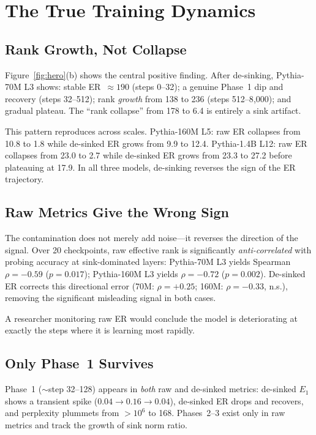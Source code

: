 \documentclass[11pt]{article}
\begin{document}
\section{The True Training Dynamics}\label{sec:true}

\subsection{Rank Growth, Not Collapse}\label{sec:growth}

Figure~\ref{fig:hero}(b) shows the central positive finding.
After de-sinking, Pythia-70M L3 shows: stable ER~$\approx 190$ (steps 0--32); a genuine Phase~1 dip and recovery (steps 32--512); rank \emph{growth} from 138 to 236 (steps 512--8{,}000); and gradual plateau.
The ``rank collapse'' from 178 to 6.4 is entirely a sink artifact.

This pattern reproduces across scales.
Pythia-160M L5: raw ER collapses from 10.8 to 1.8 while de-sinked ER grows from 9.9 to 12.4.
Pythia-1.4B L12: raw ER collapses from 23.0 to 2.7 while de-sinked ER grows from 23.3 to 27.2 before plateauing at 17.9.
In all three models, de-sinking reverses the sign of the ER trajectory.

\subsection{Raw Metrics Give the Wrong Sign}\label{sec:misleading}

The contamination does not merely add noise---it reverses the direction of the signal.
Over 20 checkpoints, raw effective rank is significantly \emph{anti-correlated} with probing accuracy at sink-dominated layers: Pythia-70M L3 yields Spearman $\rho = -0.59$ ($p = 0.017$); Pythia-160M L3 yields $\rho = -0.72$ ($p = 0.002$).
De-sinked ER corrects this directional error (70M: $\rho = +0.25$; 160M: $\rho = -0.33$, n.s.), removing the significant misleading signal in both cases.

A researcher monitoring raw ER would conclude the model is deteriorating at exactly the steps where it is learning most rapidly.

\subsection{Only Phase~1 Survives}\label{sec:phase1}

Phase~1 (${\sim}$step 32--128) appears in \emph{both} raw and de-sinked metrics: de-sinked $E_1$ shows a transient spike ($0.04 \to 0.16 \to 0.04$), de-sinked ER drops and recovers, and perplexity plummets from $>10^6$ to 168.
Phases~2--3 exist only in raw metrics and track the growth of sink norm ratio.
\end{document}
